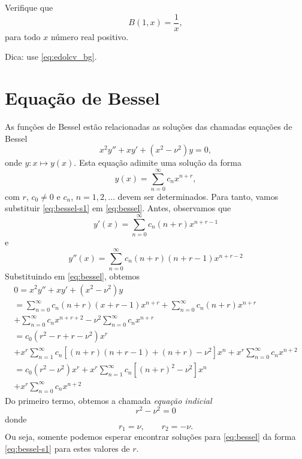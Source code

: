 \begin{exer}
  Verifique que
  \begin{equation}
    B(1,x) = \frac{1}{x},
  \end{equation}
  para todo $x$ número real positivo.
\end{exer}
\begin{resp}
  Dica: use \eqref{eq:edolcv_bg}.
\end{resp}

\section{Equação de Bessel}\label{cap_edolcv_sec_fbessel}

As funções de Bessel estão relacionadas as soluções das chamadas equações de Bessel
\begin{equation}\label{eq:bessel}
  x^2y'' + xy' + (x^2-\nu^2)y = 0,
\end{equation}
onde $y:x\mapsto y(x)$. Esta equação adimite uma solução da forma
\begin{equation}\label{eq:bessel-s1}
  y(x) = \sum_{n=0}^\infty c_nx^{n+r},
\end{equation}
com $r$, $c_0\neq 0$ e $c_n$, $n=1,2,\ldots$ devem ser determinados. Para tanto, vamos substituir \eqref{eq:bessel-s1} em \eqref{eq:bessel}. Antes, observamos que
\begin{equation}
  y'(x) = \sum_{n=0}^\infty c_n(n+r)x^{n+r-1}
\end{equation}
e
\begin{equation}
  y''(x) = \sum_{n=0}^\infty c_n(n+r)(n+r-1)x^{n+r-2}
\end{equation}
Substituindo em \eqref{eq:bessel}, obtemos
\begin{gather}
  0 = x^2y'' + xy' + (x^2-\nu^2)y \\
  = \sum_{n=0}^\infty c_n(n+r)(x+r-1)x^{n+r} + \sum_{n=0}^\infty c_n(n+r)x^{n+r} \\
  + \sum_{n=0}^\infty c_nx^{n+r+2}- \nu^2\sum_{n=0}^\infty c_nx^{n+r}\\
  = c_0(r^2-r+r-\nu^2)x^r \\                              + x^r\sum_{n=1}^\infty c_n\left[(n+r)(n+r-1)+(n+r)-\nu^2\right]x^n+ x^r\sum_{n=0}^\infty c_nx^{n+2}\\
  = c_0(r^2-\nu^2)x^r + x^r\sum_{n=1}^\infty c_n\left[(n+r)^2-\nu^2\right]x^n \\
  + x^r\sum_{n=0}^\infty c_nx^{n+2}\label{eq:bessel-s2}
\end{gather}
Do primeiro termo, obtemos a chamada \emph{equação indicial}
\begin{equation}
  r^2 - \nu^2 = 0
\end{equation}
donde
\begin{equation}
  r_1 = \nu,\qquad r_2=-\nu.
\end{equation}
Ou seja, somente podemos esperar encontrar soluções para \eqref{eq:bessel} da forma \eqref{eq:bessel-s1} para estes valores de $r$.

